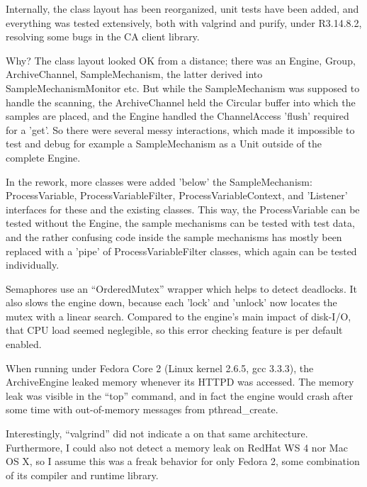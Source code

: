 \begin{itemize}
Internally, the class layout has been reorganized,
unit tests have been added, and everything was tested
extensively, both with valgrind and purify,
under R3.14.8.2, resolving some bugs in the CA client library.

Why? The class layout looked OK from a distance;
there was an Engine, Group, ArchiveChannel, SampleMechanism,
the latter derived into SampleMechanismMonitor etc.
But while the SampleMechanism was supposed to handle
the scanning, the ArchiveChannel held the Circular buffer
into which the samples are placed,
and the Engine handled the ChannelAccess 'flush' required
for a 'get'. So there were several messy interactions,
which made it impossible to test and debug for example a SampleMechanism
as a Unit outside of the complete Engine.

In the rework, more classes were added 'below' the SampleMechanism:
ProcessVariable, ProcessVariableFilter, ProcessVariableContext,
and 'Listener' interfaces for these and the existing classes.
This way, the ProcessVariable can be tested without the Engine,
the sample mechanisms can be tested with test data,
and the rather confusing code inside the sample mechanisms
has mostly been replaced with a 'pipe' of ProcessVariableFilter
classes, which again can be tested individually.

Semaphores use an ``OrderedMutex'' wrapper which helps
to detect deadlocks. It also slows the engine down, because
each 'lock' and 'unlock' now locates the mutex with a linear
search. Compared to the  engine's main impact of disk-I/O, that
CPU load seemed neglegible, so this error checking feature
is per default enabled.

\NOTE When running under Fedora Core 2 (Linux kernel 2.6.5,
gcc 3.3.3), the ArchiveEngine leaked memory whenever its HTTPD
was accessed. The memory leak was visible in the ``top'' command,
and in fact the engine would crash after some time with out-of-memory messages
from pthread\_create.

Interestingly, ``valgrind'' did not indicate a  on that
same architecture. Furthermore, I could also not detect a memory leak on RedHat WS 4
nor Mac OS X, so I assume this was a freak behavior for only Fedora 2,
some combination of its compiler and runtime library. 


\end{itemize}
